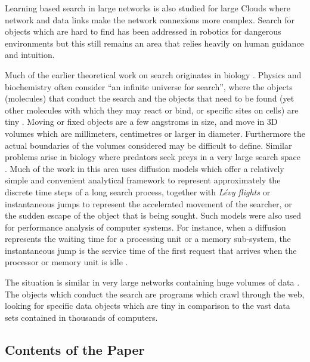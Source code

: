 \documentclass[journal]{IEEEtran}
\begin{document}
Learning based search in large networks \cite{SAN} is also studied for large Clouds
where network and data links \cite{Misbah} make the network connexions more complex.
Search for objects which are hard to find has been addressed in robotics for dangerous environments \cite{Search-mines,Mines,CAMWA2012} but
this still remains an area that relies heavily on human guidance and intuition.

Much of the earlier theoretical work on search originates in biology \cite{Gelenbe1997,Sims08}. Physics  \cite{Benichou2004} and biochemistry \cite{Eliazar2008} often consider  ``an infinite universe for search'', where the objects (molecules) that conduct the search
and the objects that need to be found (yet other molecules with which they may react or bind, or specific sites on cells) are tiny  \cite{Tilch99a}.  Moving or fixed objects are a few angstroms in size, and move in
3D volumes which are millimeters, centimetres or larger in diameter. Furthermore the actual boundaries of the volumes considered may
be difficult to define. Similar problems arise in biology where predators seek preys in a very large search space \cite{Oshanin2009}.
Much of the work in this area uses diffusion models which  offer a
relatively simple and convenient analytical framework to represent approximately the discrete time steps of a long search process,
together with {\em L\'evy flights} or instantaneous jumps \cite{Redner1}  to represent the accelerated movement of the searcher, or the sudden escape of the object that is being sought.
Such models were also used for performance analysis of computer systems. For instance, when a diffusion represents  the waiting time for a processing unit or a memory sub-system, the instantaneous jump is  the service time of the first request that arrives when the processor or memory unit is idle \cite{Gelenbe1976,Czachorski08}.

The situation is similar in very large networks containing huge volumes of data \cite{Saarland}. The objects which conduct the search are
programs which crawl through the web, looking for specific data objects which are  tiny
in comparison to the vast data sets contained in  thousands of computers.






\subsection{Contents of the Paper}
\end{document}
